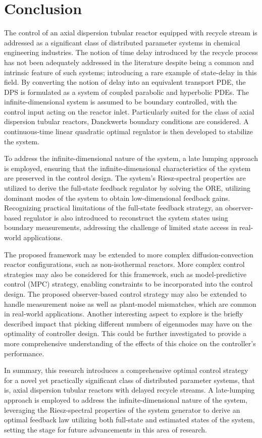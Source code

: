 \section{Conclusion}

The control of an axial dispersion tubular reactor equipped with recycle stream is addressed as a significant class of distributed parameter systems in chemical engineering industries. The notion of time delay introduced by the recycle process has not been adequately addressed in the literature despite being a common and intrinsic feature of such systems; introducing a rare example of state-delay in this field. By converting the notion of delay into an equivalent transport PDE, the DPS is formulated as a system of coupled parabolic and hyperbolic PDEs. The infinite-dimensional system is assumed to be boundary controlled, with the control input acting on the reactor inlet. Particularly suited for the class of axial dispersion tubular reactors, Danckwerts boundary conditions are considered. A continuous-time linear quadratic optimal regulator is then developed to stabilize the system.

To address the infinite-dimensional nature of the system, a late lumping approach is employed, ensuring that the infinite-dimensional characteristics of the system are preserved in the control design. The system's Riesz-spectral properties are utilized to derive the full-state feedback regulator by solving the ORE, utilizing dominant modes of the system to obtain low-dimensional feedback gains. Recognizing practical limitations of the full-state feedback strategy, an observer-based regulator is also introduced to reconstruct the system states using boundary measurements, addressing the challenge of limited state access in real-world applications.

The proposed framework may be extended to more complex diffusion-convection reactor configurations, such as non-isothermal reactors. More complex control strategies may also be considered for this framework, such as model-predictive control (MPC) strategy, enabling constraints to be incorporated into the control design. The proposed observer-based control strategy may also be extended to handle measurement noise as well as plant-model mismatches, which are common in real-world applications. Another interesting aspect to explore is the briefly described impact that picking different numbers of eigenmodes may have on the optimality of controller design. This could be further investigated to provide a more comprehensive understanding of the effects of this choice on the controller's performance.

In summary, this research introduces a comprehensive optimal control strategy for a novel yet practically significant class of distributed parameter systems, that is, axial dispersion tubular reactors with delayed recycle streams. A late-lumping approach is employed to address the infinite-dimensional nature of the system, leveraging the Riesz-spectral properties of the system generator to derive an optimal feedback law utilizing both full-state and estimated states of the system, setting the stage for future advancements in this area of research.